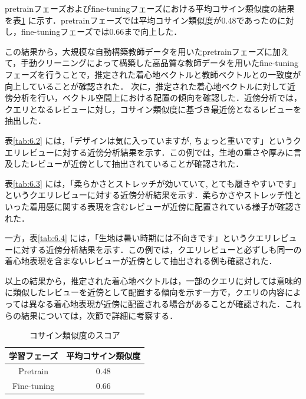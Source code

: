 \documentclass[a4paper,12pt]{jreport}
\begin{document}
pretrainフェーズおよびfine-tuningフェーズにおける平均コサイン類似度の結果を表\ref{tab:6.1} に示す．pretrainフェーズでは平均コサイン類似度が0.48であったのに対し，fine-tuningフェーズでは0.66まで向上した．

この結果から，大規模な自動構築教師データを用いたpretrainフェーズに加えて，手動クリーニングによって構築した高品質な教師データを用いたfine-tuningフェーズを行うことで，推定された着心地ベクトルと教師ベクトルとの一致度が向上していることが確認された．
次に，推定された着心地ベクトルに対して近傍分析を行い，ベクトル空間上における配置の傾向を確認した．近傍分析では，クエリとなるレビューに対し，コサイン類似度に基づき最近傍となるレビューを抽出した．

表\ref{tab:6.2} には，「デザインは気に入っていますが, ちょっと重いです」というクエリレビューに対する近傍分析結果を示す．この例では，生地の重さや厚みに言及したレビューが近傍として抽出されていることが確認された．

表\ref{tab:6.3}  には，「柔らかさとストレッチが効いていて, とても履きやすいです」というクエリレビューに対する近傍分析結果を示す．柔らかさやストレッチ性といった着用感に関する表現を含むレビューが近傍に配置されている様子が確認された．

一方，表\ref{tab:6.4}  には，「生地は暑い時期には不向きです」というクエリレビューに対する近傍分析結果を示す．この例では，クエリレビューと必ずしも同一の着心地表現を含まないレビューが近傍として抽出される例も確認された．

以上の結果から，推定された着心地ベクトルは，一部のクエリに対しては意味的に類似したレビューを近傍として配置する傾向を示す一方で，クエリの内容によっては異なる着心地表現が近傍に配置される場合があることが確認された．これらの結果については，次節で詳細に考察する．

\begin{table}[tbh]
\begin{center}
\caption{コサイン類似度のスコア}
\vspace{7mm}
\label{tab:6.1}
\begin{tabular}{|c|c|}
\hline
学習フェーズ      & 平均コサイン類似度 \\ \hline
Pretrain    & 0.48      \\ \hline
Fine-tuning & 0.66      \\ \hline
\end{tabular}
\end{center}
\end{table}
\end{document}
